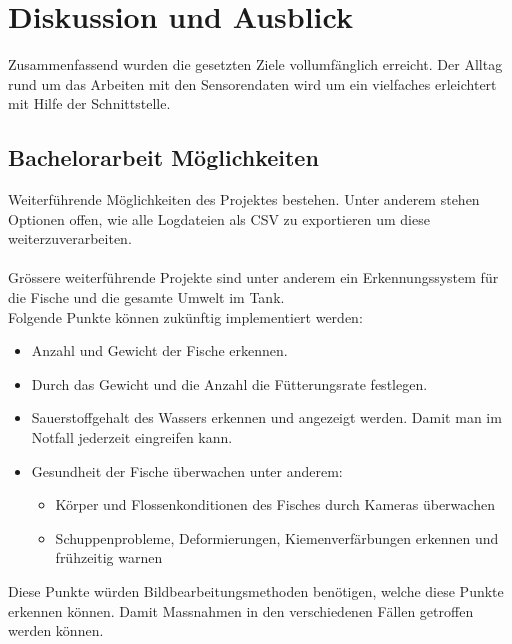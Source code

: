 \documentclass[../main.tex]{subfiles}
\begin{document}
	\section{Diskussion und Ausblick}
	Zusammenfassend wurden die gesetzten Ziele vollumfänglich erreicht. Der Alltag rund um das Arbeiten mit den Sensorendaten wird um ein vielfaches erleichtert mit Hilfe der Schnittstelle. \\
	\par
	\noindent

	\subsection{Bachelorarbeit Möglichkeiten}
	Weiterführende Möglichkeiten des Projektes bestehen. Unter anderem stehen Optionen offen, wie alle Logdateien als CSV zu exportieren um diese weiterzuverarbeiten.
	\\ \\
	Grössere weiterführende Projekte sind unter anderem ein Erkennungssystem für die Fische und die gesamte Umwelt im Tank. \\
	Folgende Punkte können zukünftig implementiert werden:
	\begin{itemize}
		\item Anzahl und Gewicht der Fische erkennen.
		\item Durch das Gewicht und die Anzahl die Fütterungsrate festlegen.
		\item Sauerstoffgehalt des Wassers erkennen und angezeigt werden. Damit man im Notfall jederzeit eingreifen kann.
		\item Gesundheit der Fische überwachen unter anderem:
		\begin{itemize}
			\item Körper und Flossenkonditionen des Fisches durch Kameras überwachen
			\item Schuppenprobleme, Deformierungen, Kiemenverfärbungen erkennen und frühzeitig warnen
		\end{itemize}
	\end{itemize}	
	Diese Punkte würden Bildbearbeitungsmethoden benötigen, welche diese Punkte erkennen können. Damit Massnahmen in den verschiedenen Fällen getroffen werden können. 
	\par 
\end{document}
